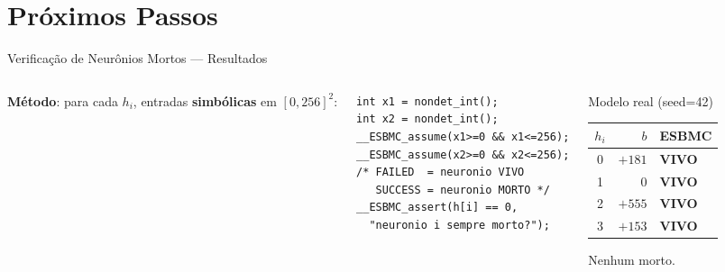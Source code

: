 \documentclass[aspectratio=169]{beamer}
\begin{document}
\section{Próximos Passos}

\begin{frame}[fragile]{Verificação de Neurônios Mortos --- Resultados}
  \begin{columns}
    \textbf{Método}: para cada $h_i$, entradas \textbf{simbólicas} em $[0,256]^2$:
    \begin{lstlisting}[style=cstyle]
int x1 = nondet_int();
int x2 = nondet_int();
__ESBMC_assume(x1>=0 && x1<=256);
__ESBMC_assume(x2>=0 && x2<=256);
/* FAILED  = neuronio VIVO
   SUCCESS = neuronio MORTO */
__ESBMC_assert(h[i] == 0,
  "neuronio i sempre morto?");
    \end{lstlisting}

    \vspace{0.15em}
    \begin{exampleblock}{Modelo real (seed=42)}
      \scriptsize
      \begin{tabular}{@{}crl@{}}
        \toprule
        $h_i$ & $b$ & ESBMC \\
        \midrule
        0 & $+181$ & \textcolor{okgreen}{\textbf{VIVO}} \\
        1 & $0$    & \textcolor{okgreen}{\textbf{VIVO}} \\
        2 & $+555$ & \textcolor{okgreen}{\textbf{VIVO}} \\
        3 & $+153$ & \textcolor{okgreen}{\textbf{VIVO}} \\
        \bottomrule
      \end{tabular}
      \quad Nenhum morto.
    \end{exampleblock}


\end{columns}
\end{frame}
\end{document}

